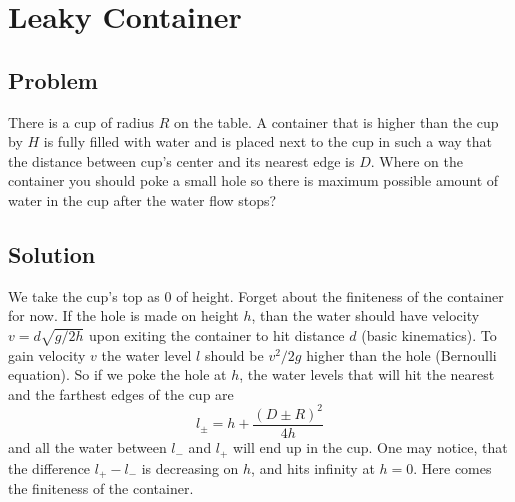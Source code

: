 \section*{Leaky Container}

\subsection*{Problem}

There is a cup of radius $R$ on the table.
A container that is higher than the cup by $H$
is fully filled with water
and is placed next to the cup in such a way
that the distance between cup's center and its nearest edge is $D$.
Where on the container you should poke a small hole
so there is maximum possible amount of water in the cup
after the water flow stops?

\subsection*{Solution}

We take the cup's top as $0$ of height.
Forget about the finiteness of the container for now.
If the hole is made on height $h$,
than the water should have velocity $v= d \sqrt{g / 2h}$
upon exiting the container to hit distance $d$ (basic kinematics).
To gain velocity $v$
the water level $l$ should be $v^2 / 2 g$ higher than the hole (Bernoulli equation).
So if we poke the hole at $h$,
the water levels that
will hit the nearest and the farthest edges of the cup are
\begin{equation}
    l_{\pm} = h + \frac{(D \pm R)^2}{4h}
\end{equation}
and all the water between $l_-$ and $l_+$ will end up in the cup.
One may notice, that
the difference $l_+ - l_-$ is decreasing on $h$,
and hits infinity at $h=0$.
Here comes the finiteness of the container.

